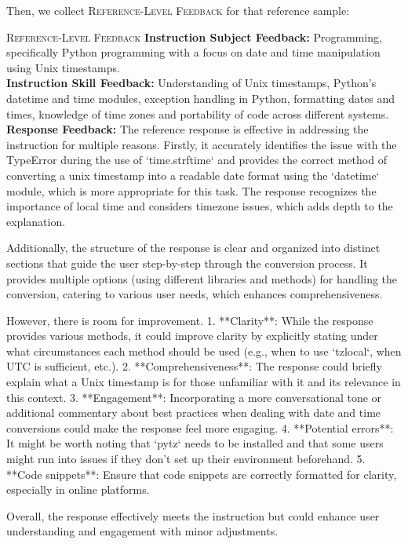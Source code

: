 Then, we collect \textsc{Reference-Level Feedback} for that reference sample:
\begin{promptbox}{\textsc{Reference-Level Feedback}}
    \textbf{Instruction Subject Feedback:} Programming, specifically Python programming with a focus on date and time manipulation using Unix timestamps. \\

    \textbf{Instruction Skill Feedback:} Understanding of Unix timestamps, Python's datetime and time modules, exception handling in Python, formatting dates and times, knowledge of time zones and portability of code across different systems. \\

    \textbf{Response Feedback:} The reference response is effective in addressing the instruction for multiple reasons. Firstly, it accurately identifies the issue with the TypeError during the use of `time.strftime` and provides the correct method of converting a unix timestamp into a readable date format using the `datetime` module, which is more appropriate for this task. The response recognizes the importance of local time and considers timezone issues, which adds depth to the explanation.
    
    Additionally, the structure of the response is clear and organized into distinct sections that guide the user step-by-step through the conversion process. It provides multiple options (using different libraries and methods) for handling the conversion, catering to various user needs, which enhances comprehensiveness.
    
    However, there is room for improvement. 
    1. **Clarity**: While the response provides various methods, it could improve clarity by explicitly stating under what circumstances each method should be used (e.g., when to use `tzlocal`, when UTC is sufficient, etc.). 
    2. **Comprehensiveness**: The response could briefly explain what a Unix timestamp is for those unfamiliar with it and its relevance in this context. 
    3. **Engagement**: Incorporating a more conversational tone or additional commentary about best practices when dealing with date and time conversions could make the response feel more engaging. 
    4. **Potential errors**: It might be worth noting that `pytz` needs to be installed and that some users might run into issues if they don't set up their environment beforehand. 
    5. **Code snippets**: Ensure that code snippets are correctly formatted for clarity, especially in online platforms.
    
    Overall, the response effectively meets the instruction but could enhance user understanding and engagement with minor adjustments.
    
\end{promptbox}


